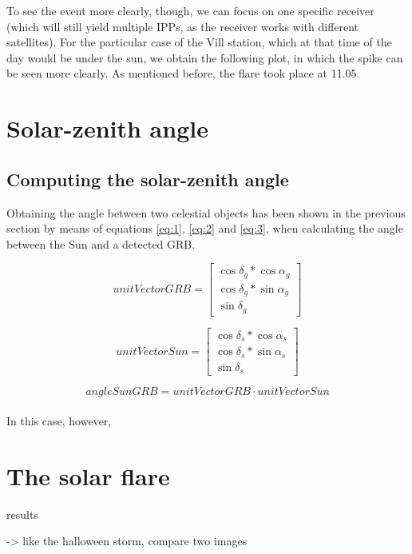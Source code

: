 To see the event more clearly, though, we can focus on one specific receiver (which will still yield multiple IPPs, as the receiver works with different satellites). For the particular case of the Vill station, which at that time of the day would be under the sun, we obtain the following plot, in which the spike can be seen more clearly. As mentioned before, the flare took place at 11.05.


\section{Solar-zenith angle}

\subsection{Computing the solar-zenith angle}

Obtaining the angle between two celestial objects has been shown in the previous section by means of equations \ref{eq:1}, \ref{eq:2} and \ref{eq:3}, when calculating the angle between the Sun and a detected GRB.

\begin{equation} \label{eq:1}
unitVectorGRB =	
\begin{bmatrix}
\cos\delta_{g} * \cos\alpha_{g} \\ 
\cos\delta_{g} * \sin\alpha_{g} \\
\sin\delta_{g}
\end{bmatrix}
\end{equation}

\begin{equation} \label{eq:2}
unitVectorSun =	
\begin{bmatrix}
\cos\delta_{s} * \cos\alpha_{s} \\ 
\cos\delta_{s} * \sin\alpha_{s} \\
\sin\delta_{s}
\end{bmatrix}
\end{equation}

\begin{equation} \label{eq:3}
angleSunGRB = unitVectorGRB \cdot unitVectorSun
\end{equation}\\

In this case, however,

\section{The solar flare}

results

 -> like the halloween storm, compare two images














